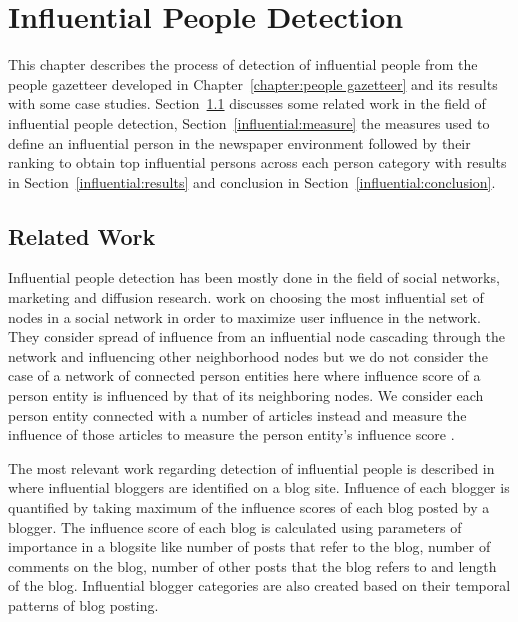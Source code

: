 \chapter{Influential People Detection}\label{chapter:influential people detection}

This chapter describes the process of detection of influential people from the people gazetteer developed in Chapter~\ref{chapter:people gazetteer} and its results with some case studies. Section~\ref{influential:rw} discusses some related work in the field of influential people detection, Section~\ref{influential:measure} the measures used to define an influential person in the newspaper environment followed by their ranking to obtain top influential persons across each person category with results in Section~\ref{influential:results} and conclusion in Section~\ref{influential:conclusion}.

 
\section{Related Work}
\label{influential:rw}

Influential people detection has been mostly done in the field of social networks, marketing and diffusion research.
\cite{kempe2003maximizing} work on choosing the most influential set of nodes  in a social network in order to maximize user influence in the network. They consider spread of influence from an influential node cascading through the network and influencing other neighborhood nodes but we do not consider the case of a network of connected person entities here where influence score of a person entity is influenced by that of its neighboring nodes. We consider each person entity connected with a number of articles instead and measure the influence of those articles to measure the person entity's influence score .

The most relevant work regarding detection of influential people is described in \cite{agarwal2008identifying} where influential bloggers are identified on a blog site. Influence of each blogger is quantified by taking maximum of the influence scores of each blog posted by a blogger. The influence score of each blog is calculated using parameters of importance in a blogsite like number of posts that refer to the blog, number of comments on the blog, number of other posts that the blog refers to and length of the blog. Influential blogger categories are also created based on their temporal patterns of blog posting. 

